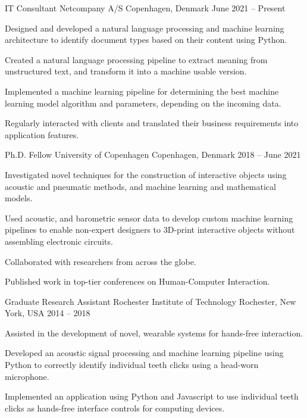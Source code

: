 

\begin{cventries}
  \cventry
    {IT Consultant}
    {Netcompany A/S}
    {Copenhagen, Denmark}
    {June 2021 -- Present}
    {
      \begin{cvitems}
        \item Designed and developed a natural language processing and machine
        learning architecture to identify document types based on their content using Python.
        \item Created a natural language processing pipeline to extract meaning
        from unstructured text, and transform it into a machine usable version.
        \item Implemented a machine learning pipeline for determining the best
        machine learning model algorithm and parameters, depending on the
        incoming data.
        \item Regularly interacted with clients and translated their business requirements into application features.
      \end{cvitems}
      \vspace{1em}
    }
    
  \cventry
    {Ph.D. Fellow}
    {University of Copenhagen}
    {Copenhagen, Denmark}
    {2018 -- June 2021}
    {
      \begin{cvitems}
        \item Investigated novel techniques for the construction of
          interactive objects using acoustic and pneumatic methods, and machine
          learning and mathematical models.
        \item Used acoustic, and barometric sensor data to develop custom
          machine learning pipelines to enable non-expert designers to 3D-print
          interactive objects without assembling electronic circuits.
        \item Collaborated with researchers from across the globe.
        \item Published work in top-tier conferences on Human-Computer
          Interaction.
      \end{cvitems}
      \vspace{1em}
    }

  \cventry
    {Graduate Research Assistant}
    {Rochester Institute of Technology}
    {Rochester, New York, USA}
    {2014 -- 2018}
    {
      \begin{cvitems}
        \item Assisted in the development of novel, wearable systems for
          hands-free interaction.
        \item Developed an acoustic signal processing and machine learning
          pipeline using Python to correctly identify individual teeth clicks
          using a head-worn microphone.
        \item Implemented an application using Python and Javascript to use
          individual teeth clicks as hands-free interface controls for
          computing devices.
      \end{cvitems}
    }


\end{cventries}
